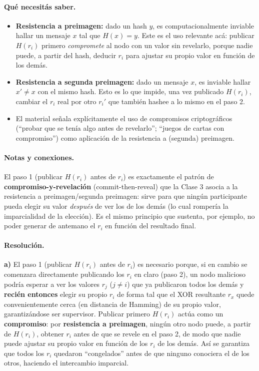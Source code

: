 \paragraph{Qué necesitás saber.}
\begin{itemize}
  \item \textbf{Resistencia a preimagen:} dado un hash $y$, es computacionalmente inviable
  hallar un mensaje $x$ tal que $H(x)=y$. Este es el uso relevante acá: publicar $H(r_i)$
  primero \emph{compromete} al nodo con un valor sin revelarlo, porque nadie puede, a partir
  del hash, deducir $r_i$ para ajustar su propio valor en función de los demás.
  \item \textbf{Resistencia a segunda preimagen:} dado un mensaje $x$, es inviable hallar
  $x'\neq x$ con el mismo hash. Esto es lo que impide, una vez publicado $H(r_i)$, cambiar
  el $r_i$ real por otro $r_i'$ que también hashee a lo mismo en el paso 2.
  \item El material señala explícitamente el uso de compromisos criptográficos (``probar que
  se tenía algo antes de revelarlo''; ``juegos de cartas con compromiso'') como aplicación de
  la resistencia a (segunda) preimagen.
\end{itemize}

\paragraph{Notas y conexiones.}
El paso 1 (publicar $H(r_i)$ antes de $r_i$) es exactamente el patrón de
\textbf{compromiso-y-revelación} (commit-then-reveal) que la Clase 3 asocia a la resistencia
a preimagen/segunda preimagen: sirve para que ningún participante pueda elegir su valor
\emph{después} de ver los de los demás (lo cual rompería la imparcialidad de la elección).
Es el mismo principio que sustenta, por ejemplo, no poder generar de antemano el $r_i$ en
función del resultado final.

\paragraph{Resolución.}

\textbf{a)} El paso 1 (publicar $H(r_i)$ antes de $r_i$) es necesario porque, si en cambio
se comenzara directamente publicando los $r_i$ en claro (paso 2), un nodo malicioso podría
esperar a ver los valores $r_j$ ($j\neq i$) que ya publicaron todos los demás y \textbf{recién
entonces} elegir su propio $r_i$ de forma tal que el XOR resultante $r_x$ quede
convenientemente cerca (en distancia de Hamming) de su propio valor, garantizándose ser
supervisor. Publicar primero $H(r_i)$ actúa como un \textbf{compromiso}: por
\textbf{resistencia a preimagen}, ningún otro nodo puede, a partir de $H(r_i)$, obtener
$r_i$ antes de que se revele en el paso 2, de modo que nadie puede ajustar su propio valor
en función de los $r_i$ de los demás. Así se garantiza que todos los $r_i$ quedaron
``congelados'' antes de que ninguno conociera el de los otros, haciendo el intercambio
imparcial.

